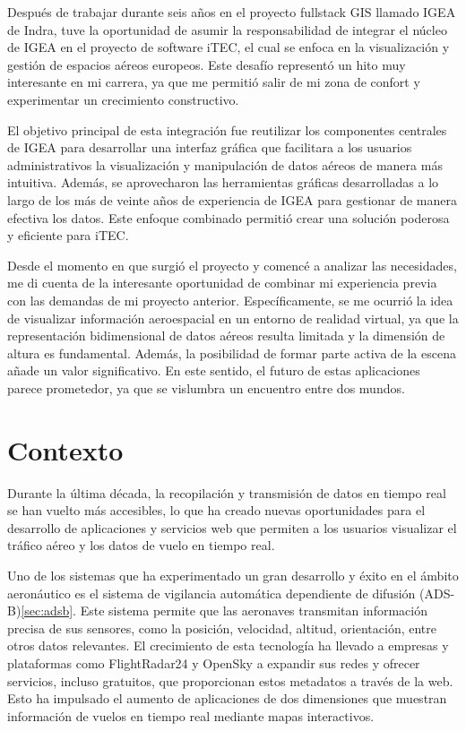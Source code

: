 \documentclass[a4paper, 11pt]{book}
\begin{document}
Después de trabajar durante seis años en el proyecto fullstack GIS llamado IGEA de Indra, tuve la oportunidad de asumir la responsabilidad de integrar el núcleo de IGEA en el proyecto de software iTEC, el cual se enfoca en la visualización y gestión de espacios aéreos europeos. Este desafío representó un hito muy interesante en mi carrera, ya que me permitió salir de mi zona de confort y experimentar un crecimiento constructivo.

El objetivo principal de esta integración fue reutilizar los componentes centrales de IGEA para desarrollar una interfaz gráfica que facilitara a los usuarios administrativos la visualización y manipulación de datos aéreos de manera más intuitiva. Además, se aprovecharon las herramientas gráficas desarrolladas a lo largo de los más de veinte años de experiencia de IGEA para gestionar de manera efectiva los datos. Este enfoque combinado permitió crear una solución poderosa y eficiente para iTEC.

Desde el momento en que surgió el proyecto y comencé a analizar las necesidades, me di cuenta de la interesante oportunidad de combinar mi experiencia previa con las demandas de mi proyecto anterior. Específicamente, se me ocurrió la idea de visualizar información aeroespacial en un entorno de realidad virtual, ya que la representación bidimensional de datos aéreos resulta limitada y la dimensión de altura es fundamental. Además, la posibilidad de formar parte activa de la escena añade un valor significativo. En este sentido, el futuro de estas aplicaciones parece prometedor, ya que se vislumbra un encuentro entre dos mundos.

\section{Contexto}
\label{sec:contexto}
Durante la última década, la recopilación y transmisión de datos en tiempo real se han vuelto más accesibles, lo que ha creado nuevas oportunidades para el desarrollo de aplicaciones y servicios web que permiten a los usuarios visualizar el tráfico aéreo y los datos de vuelo en tiempo real.

Uno de los sistemas que ha experimentado un gran desarrollo y éxito en el ámbito aeronáutico es el sistema de vigilancia automática dependiente de difusión (ADS-B)\ref{sec:adsb}. Este sistema permite que las aeronaves transmitan información precisa de sus sensores, como la posición, velocidad, altitud, orientación, entre otros datos relevantes. El crecimiento de esta tecnología ha llevado a empresas y plataformas como FlightRadar24 y OpenSky a expandir sus redes y ofrecer servicios, incluso gratuitos, que proporcionan estos metadatos a través de la web. Esto ha impulsado el aumento de aplicaciones de dos dimensiones que muestran información de vuelos en tiempo real mediante mapas interactivos.
\end{document}
